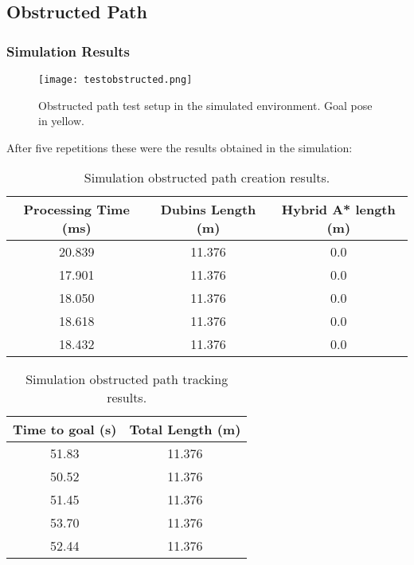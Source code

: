 \subsection{Obstructed Path}
\label{subsec:obstructed_path}
\subsubsection{Simulation Results}

\begin{figure}[h]
    \centering
    \texttt{[image: testobstructed.png]}
    \caption{Obstructed path test setup in the simulated environment. Goal pose in yellow.}
    \label{fig:obstructed_path}
\end{figure}

After five repetitions these were the results obtained in the simulation:

\begin{table}[H]
    \centering
    \begin{tabular}{|c|c|c|}
        \hline
        \textbf{Processing Time (ms)} & \textbf{Dubins Length (m)} & \textbf{Hybrid A* length (m)} \\
        \hline
         20.839 & 11.376 & 0.0 \\
        \hline
         17.901 & 11.376 & 0.0 \\
         \hline
         18.050 & 11.376 & 0.0 \\
         \hline
         18.618 & 11.376 & 0.0 \\
         \hline
         18.432 & 11.376 & 0.0 \\
         \hline
    \end{tabular}
    \caption{Simulation obstructed path creation results.}
    \label{tab:obstructed_path_results1}
\end{table}
\begin{table}[H]
    \centering
    \begin{tabular}{|c|c|}
        \hline
        \textbf{Time to goal (s)} & \textbf{Total Length (m)} \\
         \hline
         51.83 & 11.376 \\
         \hline
         50.52 & 11.376 \\
         \hline
         51.45 & 11.376 \\
         \hline
         53.70 & 11.376 \\
         \hline
         52.44 & 11.376 \\
         \hline
    \end{tabular}
    \caption{Simulation obstructed path tracking results.}
    \label{tab:obstructed_path_results2}
\end{table}
\clearpage

